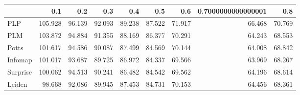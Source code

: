 \begin{tabular}{lrrrrrrrr}
\toprule
{} &     0.1 &    0.2 &    0.3 &    0.4 &    0.5 &    0.6 & 0.7000000000000001 &    0.8 \\
\midrule
PLP      & 105.928 & 96.139 & 92.093 & 89.238 & 87.522 & 71.917 &             66.468 & 70.769 \\
PLM      & 103.872 & 94.884 & 91.355 & 88.169 & 86.377 & 70.291 &             64.243 & 68.553 \\
Potts    & 101.617 & 94.586 & 90.087 & 87.499 & 84.569 & 70.144 &             64.008 & 68.842 \\
Infomap  & 101.017 & 93.687 & 89.725 & 86.972 & 84.337 & 69.566 &             63.969 & 68.267 \\
Surprise & 100.062 & 94.513 & 90.241 & 86.482 & 84.542 & 69.562 &             64.196 & 68.614 \\
Leiden   &  98.668 & 92.086 & 89.945 & 87.453 & 84.731 & 70.153 &             64.456 & 68.361 \\
\bottomrule
\end{tabular}
